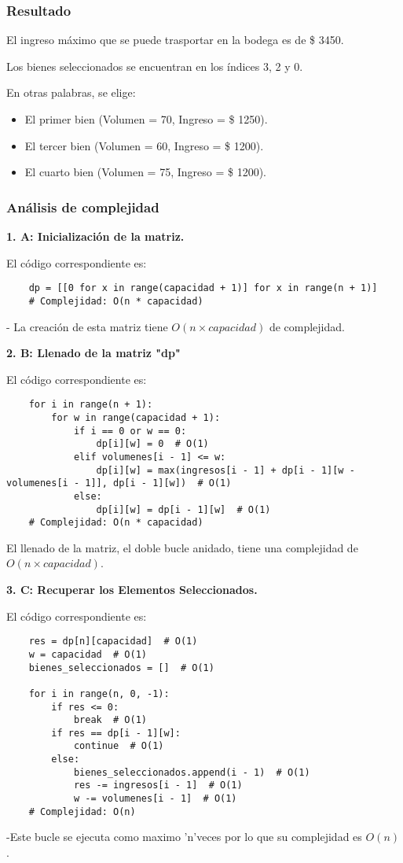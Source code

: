 \subsubsection{Resultado}
El ingreso máximo que se puede trasportar en la bodega es de \$ 3450.

Los bienes seleccionados se encuentran en los índices 3, 2 y 0.

En otras palabras, se elige:
\begin{itemize}
\item El primer bien (Volumen = 70, Ingreso = \$ 1250).
\item El tercer bien (Volumen = 60, Ingreso = \$ 1200).
\item El cuarto bien (Volumen = 75, Ingreso = \$ 1200).
 \end{itemize}

\subsubsection{Análisis de complejidad}


\textbf{1. A: Inicialización de la matriz.}

El código correspondiente es:
\begin{lstlisting}
	dp = [[0 for x in range(capacidad + 1)] for x in range(n + 1)]
	# Complejidad: O(n * capacidad)
\end{lstlisting}

- La creación de esta matriz tiene \( O(n \times capacidad) \) de complejidad. 

\textbf{2. B: Llenado de la matriz "dp"}

El código correspondiente es:
\begin{lstlisting}
	for i in range(n + 1):
		for w in range(capacidad + 1):
			if i == 0 or w == 0:
				dp[i][w] = 0  # O(1)
			elif volumenes[i - 1] <= w:
				dp[i][w] = max(ingresos[i - 1] + dp[i - 1][w - volumenes[i - 1]], dp[i - 1][w])  # O(1)
			else:
				dp[i][w] = dp[i - 1][w]  # O(1)
	# Complejidad: O(n * capacidad)
\end{lstlisting}

El llenado de la matriz, el doble bucle anidado, tiene una complejidad de \( O(n \times capacidad) \).

\textbf{3. C: Recuperar los Elementos Seleccionados.}

El código correspondiente es:
\begin{lstlisting}
	res = dp[n][capacidad]  # O(1)
	w = capacidad  # O(1)
	bienes_seleccionados = []  # O(1)
	
	for i in range(n, 0, -1):
		if res <= 0:
			break  # O(1)
		if res == dp[i - 1][w]:
			continue  # O(1)
		else:
			bienes_seleccionados.append(i - 1)  # O(1)
			res -= ingresos[i - 1]  # O(1)
			w -= volumenes[i - 1]  # O(1)
	# Complejidad: O(n)
\end{lstlisting}
-Este bucle se ejecuta como maximo 'n'veces por lo que su complejidad es \( O(n) \).

